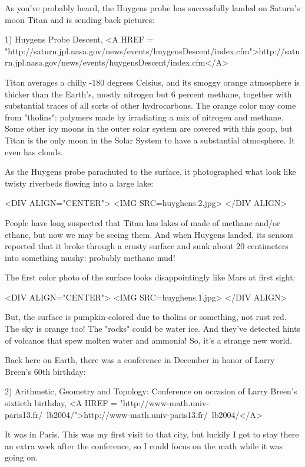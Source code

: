 

As you've probably heard, the Huygens probe has successfully landed
on Saturn's moon Titan and is sending back pictures:

1) Huygens Probe Descent,
<A HREF = "http://saturn.jpl.nasa.gov/news/events/huygensDescent/index.cfm">http://saturn.jpl.nasa.gov/news/events/huygensDescent/index.cfm</A>

Titan averages a chilly -180 degrees Celsius, and its smoggy orange
atmosphere is thicker than the Earth's, mostly nitrogen but 6 percent
methane, together with substantial traces of all sorts of other
hydrocarbons.  The orange color may come from "tholins":
polymers made by irradiating a mix of nitrogen and methane.  Some
other icy moons in the outer solar system are covered with this goop,
but Titan is the only moon in the Solar System to have a substantial
atmosphere.  It even has clouds.

As the Huygens probe parachuted to the surface, it photographed
what look like twisty riverbeds flowing into a large lake:

<DIV ALIGN="CENTER">
<IMG SRC=huyghens.2.jpg>
</DIV ALIGN>

People 
have long suspected that Titan has lakes of made of methane and/or 
ethane, but now we may be seeing them.  And when Huygens landed, its
sensors reported that it broke through a crusty surface and sunk 
about 20 centimeters into something mushy: probably methane mud! 

The first color photo of the surface looks disappointingly like Mars 
at first sight:

<DIV ALIGN="CENTER">
<IMG SRC=huyghens.1.jpg>
</DIV ALIGN>



But, the surface is pumpkin-colored due to tholins
or something, not rust red.  The sky is orange too!  
The "rocks" could 
be water ice.  And they've detected hints of volcanos that spew molten
water and ammonia!  So, it's a strange new world.

Back here on Earth, there was a conference in December in honor of 
Larry Breen's 60th birthday:

2) Arithmetic, Geometry and Topology: Conference on occasion of Larry
Breen's sixtieth birthday, 
<A HREF = "http://www-math.univ-paris13.fr/~lb2004/">http://www-math.univ-paris13.fr/~lb2004/</A>

It was in Paris.  This was my first visit to that city, but luckily 
I got to stay there an extra week after the conference, so I could focus
on the math while it was going on.  

